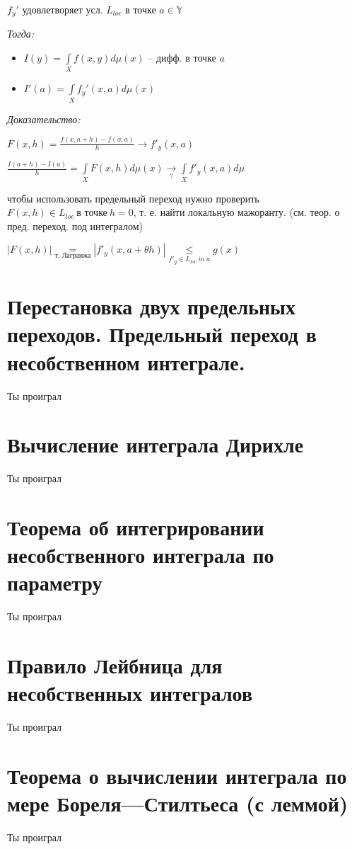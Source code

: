 \documentclass[paper=a4, fontsize=14pt]{report}
\begin{document}
$ f_y' $ удовлетворяет усл. $ L_{loc} $ в точке $ a \in \mathbb{Y}$

\emph{Тогда:}
\begin{itemize}
	\item $ I(y) = \int\limits_{X} f(x, y) d\mu(x) $ -- дифф. в точке $ a $
	\item $ I'(a) = \int\limits_{X} f_y'(x, a) d\mu(x) $
\end{itemize}


\emph{Доказательство:}

	$ F(x, h) = \frac{f(x, a + h) - f(x, a)}{h} \rightarrow f'_y(x, a) $

	$ \frac{I(a + h) - I(a)}{h} = \int\limits_X F(x, h) d\mu(x)
	  \underset{?}{\rightarrow} \int\limits_X f'_y(x, a) d\mu$

	  чтобы использовать предельный переход нужно проверить
	  $ F(x, h) \in L_{loc} ~ \text{в точке} ~  h = 0 $, т. е. найти локальную мажоранту. (см. теор. о пред. переход. под интегралом)

	$ |F(x, h)| \underset{\text{т. Лагранжа}}{=}
	|f'_y(x, a + \theta h)| \underset{f'_y \in L_{loc} ~ in ~ a}{\leq} g(x) $



    \section{Перестановка двух предельных переходов. Предельный переход в несобственном интеграле.}
    Ты проиграл

    \section{Вычисление интеграла Дирихле}
    Ты проиграл

    \section{Теорема об интегрировании несобственного интеграла по параметру}
    Ты проиграл

    \section{Правило Лейбница для несобственных интегралов}
    Ты проиграл

    \section{Теорема о вычислении интеграла по мере Бореля---Стилтьеса (с леммой)}
    Ты проиграл
\end{document}
